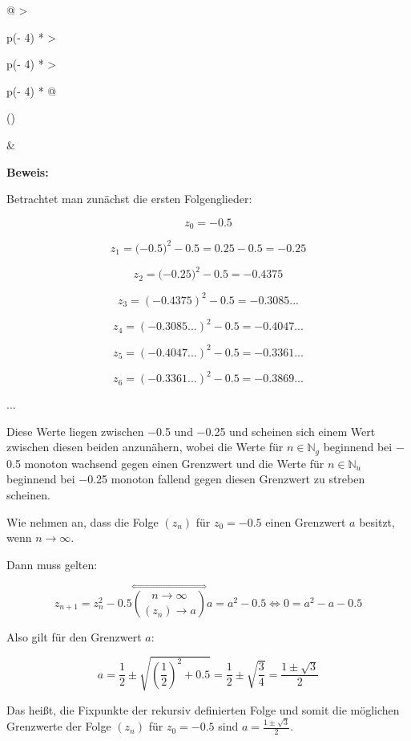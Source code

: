 \documentclass[a4paper, 12pt]{book}
\begin{document}
\begin{longtable}[]{@{}
  >{\raggedright\arraybackslash}p{(\columnwidth - 4\tabcolsep) * }
  >{\raggedright\arraybackslash}p{(\columnwidth - 4\tabcolsep) * }
  >{\raggedright\arraybackslash}p{(\columnwidth - 4\tabcolsep) * }@{}}
\toprule()
\begin{minipage}[b]{\linewidth}\raggedright
\end{minipage} & \begin{minipage}[b]{\linewidth}\raggedright
\textbf{Beweis:}

Betrachtet man zunächst die ersten Folgenglieder:

\[z_{0} =  - 0.5\]

\[z_{1} = ( - {0.5)}^{2} - 0.5 = 0.25 - 0.5 =  - 0.25\]

\[z_{2} = ( - {0.25)}^{2} - 0.5 =  - 0.4375\]

\[z_{3} = {( - 0.4375)}^{2} - 0.5 =  - 0.3085...\]

\[z_{4} = {( - 0.3085...)}^{2} - 0.5 =  - 0.4047...\]

\[z_{5} = {( - 0.4047...)}^{2} - 0.5 =  - 0.3361...\]

\[z_{6} = {( - 0.3361...)}^{2} - 0.5 =  - 0.3869...\]

...

Diese Werte liegen zwischen \(-\)0.5 und \(-\)0.25 und scheinen sich
einem Wert zwischen diesen beiden anzunähern, wobei die Werte für
\(n \in \mathbb{N}_{g}\) beginnend bei \(-\)0.5 monoton wachsend
gegen einen Grenzwert und die Werte für \(n \in \mathbb{N}_{u}\)
beginnend bei \(-\)0.25 monoton fallend gegen diesen Grenzwert zu
streben scheinen.

Wie nehmen an, dass die Folge \(\left( z_{n} \right)\) für
\(z_{0} =  - 0.5\) einen Grenzwert \(a\) besitzt, wenn
\(n \rightarrow \infty\).

Dann muss gelten:

\[z_{n + 1} = z_{n}^{2} - 0.5\overset{\Leftrightarrow}{\binom{n \rightarrow \infty}{\left( z_{n} \right) \rightarrow a}}a = a^{2} - 0.5 \Longleftrightarrow 0 = a^{2} - a - 0.5\]

Also gilt für den Grenzwert \(a\):

\[a = \frac{1}{2} \pm \sqrt{\left( \frac{1}{2} \right)^{2} + 0.5} = \frac{1}{2} \pm \sqrt{\frac{3}{4}} = \frac{1 \pm \sqrt{3}}{2}\]

Das heißt, die Fixpunkte der rekursiv definierten Folge und somit die
möglichen Grenzwerte der Folge \(\left( z_{n} \right)\) für
\(z_{0} =  - 0.5\) sind \(a = \frac{1 \pm \sqrt{3}}{2}\).


\end{minipage}
\end{longtable}
\end{document}
